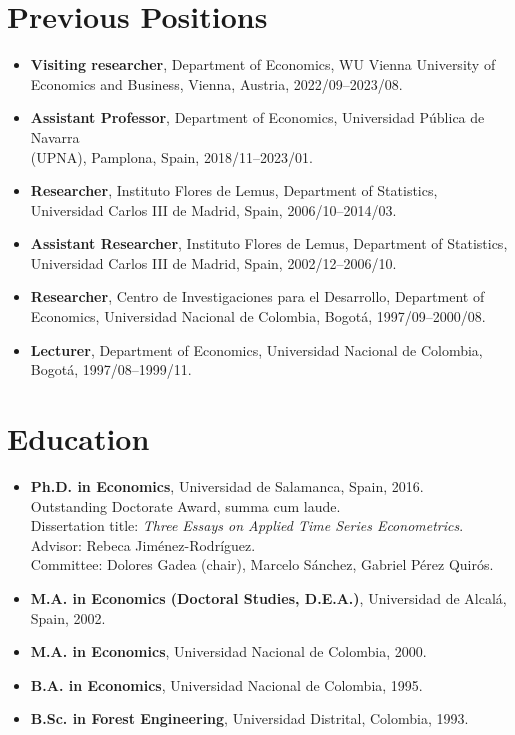 \documentclass[11pt]{article}\usepackage[]{graphicx}\usepackage[usenames,dvipsnames]{xcolor}
\begin{document}
{%
\section{Previous Positions} 
\begin{itemize}
  \item\textbf{Visiting researcher}, Department of Economics, WU Vienna University of Economics and Business, Vienna, Austria, 2022/09--2023/08.\\
  \item\textbf{Assistant Professor}, Department of Economics, Universidad Pública de Navarra\\ (UPNA), Pamplona, Spain, 2018/11--2023/01.
  \item \textbf{Researcher}, Instituto Flores de Lemus, Department of Statistics, Universidad Carlos III de Madrid, Spain, 2006/10--2014/03.
  \item \textbf{Assistant Researcher}, Instituto Flores de Lemus, Department of Statistics, Universidad Carlos III de Madrid, Spain, 2002/12--2006/10.
  \item \textbf{Researcher}, Centro de Investigaciones para el Desarrollo, Department of Economics, Universidad Nacional de Colombia, Bogotá, 1997/09--2000/08.
  \item \textbf{Lecturer}, Department of Economics, Universidad Nacional de Colombia, Bogotá, 1997/08--1999/11.
\end{itemize}

\section{Education}
\begin{itemize}
  \item {\textbf{Ph.D. in Economics}, Universidad de Salamanca, Spain, 2016.\\
  Outstanding Doctorate Award, summa cum laude.\\
  Dissertation title: \emph{Three Essays on Applied Time Series Econometrics}.\\
  Advisor: Rebeca Jiménez-Rodríguez.\\
  Committee: Dolores Gadea (chair), Marcelo Sánchez, Gabriel Pérez Quirós.}
  \item \textbf{M.A. in Economics (Doctoral Studies, D.E.A.)}, Universidad de Alcalá, Spain, 2002.
  \item \textbf{M.A. in Economics}, Universidad Nacional de Colombia, 2000.
  \item \textbf{B.A. in Economics}, Universidad Nacional de Colombia, 1995.
  \item \textbf{B.Sc. in Forest Engineering}, Universidad Distrital, Colombia, 1993.
\end{itemize}

}
\end{document}
